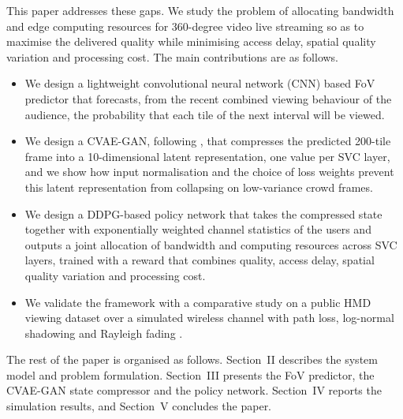 \documentclass[conference]{IEEEtran}
\begin{document}
This paper addresses these gaps. We study the problem of allocating bandwidth and edge computing resources for 360-degree video live streaming so as to maximise the delivered quality while minimising access delay, spatial quality variation and processing cost. The main contributions are as follows.
\begin{itemize}
\item We design a lightweight convolutional neural network (CNN) based FoV predictor that forecasts, from the recent combined viewing behaviour of the audience, the probability that each tile of the next interval will be viewed.
\item We design a CVAE-GAN, following \cite{b14}, that compresses the predicted 200-tile frame into a 10-dimensional latent representation, one value per SVC layer, and we show how input normalisation and the choice of loss weights prevent this latent representation from collapsing on low-variance crowd frames.
\item We design a DDPG-based policy network \cite{b16} that takes the compressed state together with exponentially weighted channel statistics of the users and outputs a joint allocation of bandwidth and computing resources across SVC layers, trained with a reward that combines quality, access delay, spatial quality variation and processing cost.
\item We validate the framework with a comparative study on a public HMD viewing dataset \cite{b17} over a simulated wireless channel with path loss, log-normal shadowing and Rayleigh fading \cite{b15}.
\end{itemize}

The rest of the paper is organised as follows. Section~II describes the system model and problem formulation. Section~III presents the FoV predictor, the CVAE-GAN state compressor and the policy network. Section~IV reports the simulation results, and Section~V concludes the paper.

\end{document}
